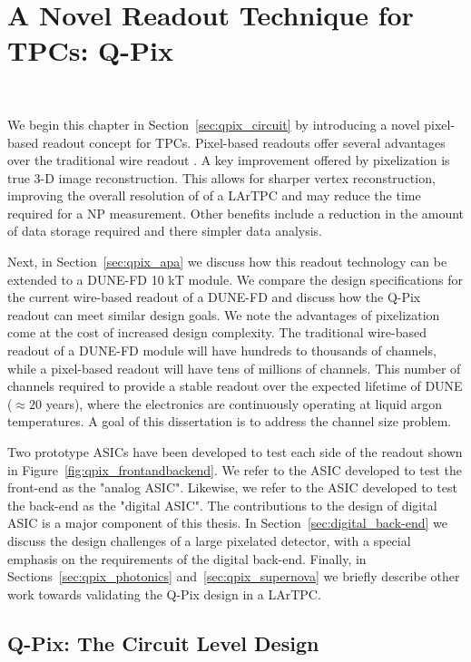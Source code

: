 \chapter{A Novel Readout Technique for TPCs: Q-Pix}~\label{chap:qpix}

We begin this chapter in Section~\ref{sec:qpix_circuit} by introducing a novel pixel-based readout concept for TPCs.
Pixel-based readouts offer several advantages over the traditional wire readout \citep{lartpc_recon_problems_joshi_2015}.
A key improvement offered by pixelization is true 3-D image reconstruction.
This allows for sharper vertex reconstruction, improving the overall resolution of of a LArTPC and may reduce the time required for a NP measurement.
Other benefits include a reduction in the amount of data storage required and there simpler data analysis.

Next, in Section~\ref{sec:qpix_apa} we discuss how this readout technology can be extended to a DUNE-FD 10 kT module.
We compare the design specifications for the current wire-based readout of a DUNE-FD and discuss how the Q-Pix readout can meet similar design goals.
We note the advantages of pixelization come at the cost of increased design complexity.
The traditional wire-based readout of a DUNE-FD module will have hundreds to thousands of channels, while a pixel-based readout will have tens of millions of channels.
This number of channels required to provide a stable readout over the expected lifetime of DUNE ($\approx 20$ years), where the electronics are continuously operating at liquid argon temperatures.
A goal of this dissertation is to address the channel size problem.

Two prototype ASICs have been developed to test each side of the readout shown in Figure~\ref{fig:qpix_frontandbackend}.
We refer to the ASIC developed to test the front-end as the "analog ASIC".
Likewise, we refer to the ASIC developed to test the back-end as the "digital ASIC".
The contributions to the design of digital ASIC is a major component of this thesis.
In Section~\ref{sec:digital_back-end} we discuss the design challenges of a large pixelated detector, with a special emphasis on the requirements of the digital back-end.
Finally, in Sections~\ref{sec:qpix_photonics} and~\ref{sec:qpix_supernova} we briefly describe other work towards validating the Q-Pix design in a LArTPC.

\section{Q-Pix: The Circuit Level Design}~\label{sec:qpix_circuit}

